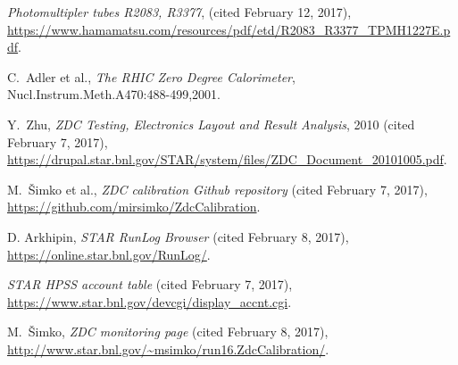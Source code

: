 \begin{thebibliography}{9}
 \textit{Photomultipler tubes R2083, R3377}, 
(cited February 12, 2017),
\url{https://www.hamamatsu.com/resources/pdf/etd/R2083_R3377_TPMH1227E.pdf}.

 C.\ Adler et al., \textit{The RHIC Zero Degree Calorimeter},
Nucl.Instrum.Meth.A470:488-499,2001.

 Y.\ Zhu, \textit{ZDC Testing, Electronics Layout and Result Analysis}, 2010
(cited February 7, 2017),
\url{https://drupal.star.bnl.gov/STAR/system/files/ZDC_Document_20101005.pdf}.

 M.\ Šimko et al., \textit{ZDC calibration Github repository}
(cited February 7, 2017), \url{https://github.com/mirsimko/ZdcCalibration}.

 D. Arkhipin, \textit{STAR RunLog Browser} (cited February 8, 2017),
\url{https://online.star.bnl.gov/RunLog/}.

 \textit{STAR HPSS account table} (cited February 7, 2017),
\url{https://www.star.bnl.gov/devcgi/display_accnt.cgi}.

 M.\ Šimko, \textit{ZDC monitoring page} (cited February 8, 2017),
\url{http://www.star.bnl.gov/~msimko/run16.ZdcCalibration/}.
\end{thebibliography}
